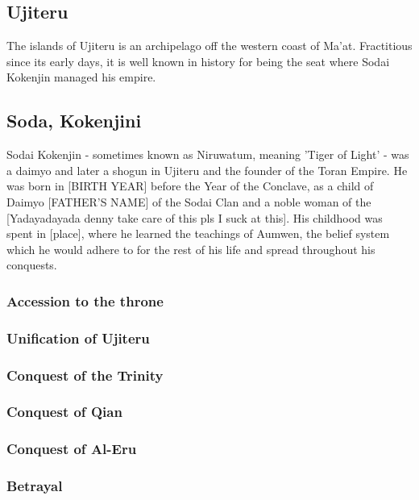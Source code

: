 \begin{multicols}{2}
	\section{Ujiteru}
		The islands of Ujiteru is an archipelago off the western coast of Ma'at. Fractitious since its early days, it is well known in history for being the seat where Sodai Kokenjin managed his empire.
		\subsection{Soda, Kokenjini}
					 
			Sodai Kokenjin - sometimes known as Niruwatum, meaning 'Tiger of Light' - was a daimyo and later a shogun in Ujiteru and the founder of the Toran Empire. He was born in [BIRTH YEAR] before the Year of the Conclave, as a child of Daimyo [FATHER'S NAME] of the Sodai Clan and a noble woman of the [Yadayadayada denny take care of this pls I suck at this]. His childhood was spent in [place], where he learned the teachings of Aumwen, the belief system which he would adhere to for the rest of his life and spread throughout his conquests.\par
			\subsubsection{Accession to the throne}
			\subsubsection{Unification of Ujiteru}
			\subsubsection{Conquest of the Trinity}
			\subsubsection{Conquest of Qian}
			\subsubsection{Conquest of Al-Eru}
			\subsubsection{Betrayal}

\end{multicols}
